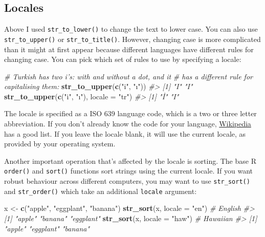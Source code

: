 \documentclass[]{book}
\newenvironment{Shaded}{\begin{snugshade}}{\end{snugshade}}
\newcommand{\KeywordTok}[1]{\textcolor[rgb]{0.13,0.29,0.53}{\textbf{#1}}}
\newcommand{\DataTypeTok}[1]{\textcolor[rgb]{0.13,0.29,0.53}{#1}}
\newcommand{\StringTok}[1]{\textcolor[rgb]{0.31,0.60,0.02}{#1}}
\newcommand{\CommentTok}[1]{\textcolor[rgb]{0.56,0.35,0.01}{\textit{#1}}}
\newcommand{\NormalTok}[1]{#1}
\begin{document}
\subsection{Locales}\label{locales}

Above I used \texttt{str\_to\_lower()} to change the text to lower case.
You can also use \texttt{str\_to\_upper()} or \texttt{str\_to\_title()}.
However, changing case is more complicated than it might at first appear
because different languages have different rules for changing case. You
can pick which set of rules to use by specifying a locale:

\begin{Shaded}
\begin{Highlighting}[]
\CommentTok{# Turkish has two i's: with and without a dot, and it}
\CommentTok{# has a different rule for capitalising them:}
\KeywordTok{str_to_upper}\NormalTok{(}\KeywordTok{c}\NormalTok{(}\StringTok{"i"}\NormalTok{, }\StringTok{"ı"}\NormalTok{))}
\CommentTok{#> [1] "I" "I"}
\KeywordTok{str_to_upper}\NormalTok{(}\KeywordTok{c}\NormalTok{(}\StringTok{"i"}\NormalTok{, }\StringTok{"ı"}\NormalTok{), }\DataTypeTok{locale =} \StringTok{"tr"}\NormalTok{)}
\CommentTok{#> [1] "İ" "I"}
\end{Highlighting}
\end{Shaded}

The locale is specified as a ISO 639 language code, which is a two or
three letter abbreviation. If you don't already know the code for your
language,
\href{https://en.wikipedia.org/wiki/List_of_ISO_639-1_codes}{Wikipedia}
has a good list. If you leave the locale blank, it will use the current
locale, as provided by your operating system.

Another important operation that's affected by the locale is sorting.
The base R \texttt{order()} and \texttt{sort()} functions sort strings
using the current locale. If you want robust behaviour across different
computers, you may want to use \texttt{str\_sort()} and
\texttt{str\_order()} which take an additional \texttt{locale} argument:

\begin{Shaded}
\begin{Highlighting}[]
\NormalTok{x <-}\StringTok{ }\KeywordTok{c}\NormalTok{(}\StringTok{"apple"}\NormalTok{, }\StringTok{"eggplant"}\NormalTok{, }\StringTok{"banana"}\NormalTok{)}
\KeywordTok{str_sort}\NormalTok{(x, }\DataTypeTok{locale =} \StringTok{"en"}\NormalTok{)  }\CommentTok{# English}
\CommentTok{#> [1] "apple"    "banana"   "eggplant"}
\KeywordTok{str_sort}\NormalTok{(x, }\DataTypeTok{locale =} \StringTok{"haw"}\NormalTok{) }\CommentTok{# Hawaiian}
\CommentTok{#> [1] "apple"    "eggplant" "banana"}
\end{Highlighting}
\end{Shaded}
\end{document}
